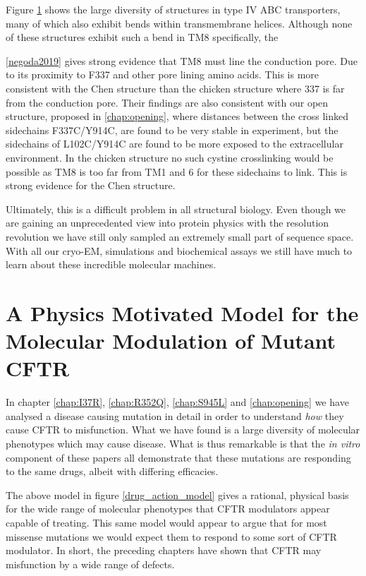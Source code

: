 Figure \ref{} shows the large diversity of structures in type IV ABC transporters, many of which also exhibit bends within transmembrane helices\cite{thomas2020}. Although none of these structures exhibit such a bend in TM8 specifically, the 

\ref{negoda2019} gives strong evidence that TM8 must line the conduction pore. Due to its proximity to F337 and other pore lining amino acids. This is more consistent with the Chen structure than the chicken structure where 337 is far from the conduction pore. Their findings are also consistent with our open structure, proposed in \ref{chap:opening}, where distances between the cross linked sidechains F337C/Y914C, are found to be very stable in experiment, but the sidechains of L102C/Y914C are found to be more exposed to the extracellular environment. In the chicken structure no such cystine crosslinking would be possible as TM8 is too far from TM1 and 6 for these sidechains to link. This is strong evidence for the Chen structure.

Ultimately, this is a difficult problem in all structural biology. Even though we are gaining an unprecedented view into protein physics with the resolution revolution we have still only sampled an extremely small part of sequence space. With all our cryo-EM, simulations and biochemical assays we still have much to learn about these incredible molecular machines.

\section{A Physics Motivated Model for the Molecular Modulation of Mutant CFTR }
In chapter \ref{chap:I37R}, \ref{chap:R352Q}, \ref{chap:S945L} and \ref{chap:opening} we have analysed a disease causing mutation in detail in order to understand \textit{how} they cause CFTR to misfunction. What we have found is a large diversity of molecular phenotypes which may cause disease. What is thus remarkable is that the \textit{in vitro} component of these papers all demonstrate that these mutations are responding to the same drugs, albeit with differing efficacies.



The above model in figure \ref{drug_action_model} gives a rational, physical basis for the wide range of molecular phenotypes that CFTR modulators appear capable of treating. This same model would appear to argue that for most missense mutations we would expect them to respond to some sort of CFTR modulator. In short, the preceding chapters have shown that CFTR may misfunction by a wide range of defects. 

